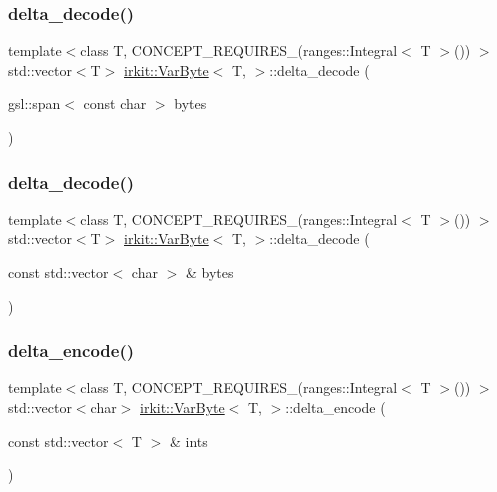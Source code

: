 \subsubsection{\texorpdfstring{delta\+\_\+decode()}{delta\_decode()}\hspace{0.1cm}{\footnotesize\ttfamily [1/2]}}
{\footnotesize\ttfamily template$<$class T, C\+O\+N\+C\+E\+P\+T\+\_\+\+R\+E\+Q\+U\+I\+R\+E\+S\+\_\+(ranges\+::\+Integral$<$ T $>$()) $>$ \\
std\+::vector$<$T$>$ \hyperlink{structirkit_1_1VarByte}{irkit\+::\+Var\+Byte}$<$ T, $>$\+::delta\+\_\+decode (\begin{DoxyParamCaption}\item[{gsl\+::span$<$ const char $>$}]{bytes }\end{DoxyParamCaption})\hspace{0.3cm}{\ttfamily [inline]}}

\mbox{\label{structirkit_1_1VarByte_aefcc29aed7e2f454dadcc869eea99201}} 
\subsubsection{\texorpdfstring{delta\+\_\+decode()}{delta\_decode()}\hspace{0.1cm}{\footnotesize\ttfamily [2/2]}}
{\footnotesize\ttfamily template$<$class T, C\+O\+N\+C\+E\+P\+T\+\_\+\+R\+E\+Q\+U\+I\+R\+E\+S\+\_\+(ranges\+::\+Integral$<$ T $>$()) $>$ \\
std\+::vector$<$T$>$ \hyperlink{structirkit_1_1VarByte}{irkit\+::\+Var\+Byte}$<$ T, $>$\+::delta\+\_\+decode (\begin{DoxyParamCaption}\item[{const std\+::vector$<$ char $>$ \&}]{bytes }\end{DoxyParamCaption})\hspace{0.3cm}{\ttfamily [inline]}}

\mbox{\label{structirkit_1_1VarByte_a0182cbcb0c80705b7effe6cb2dc7cd6b}} 
\subsubsection{\texorpdfstring{delta\+\_\+encode()}{delta\_encode()}}
{\footnotesize\ttfamily template$<$class T, C\+O\+N\+C\+E\+P\+T\+\_\+\+R\+E\+Q\+U\+I\+R\+E\+S\+\_\+(ranges\+::\+Integral$<$ T $>$()) $>$ \\
std\+::vector$<$char$>$ \hyperlink{structirkit_1_1VarByte}{irkit\+::\+Var\+Byte}$<$ T, $>$\+::delta\+\_\+encode (\begin{DoxyParamCaption}\item[{const std\+::vector$<$ T $>$ \&}]{ints }\end{DoxyParamCaption})\hspace{0.3cm}{\ttfamily [inline]}}

